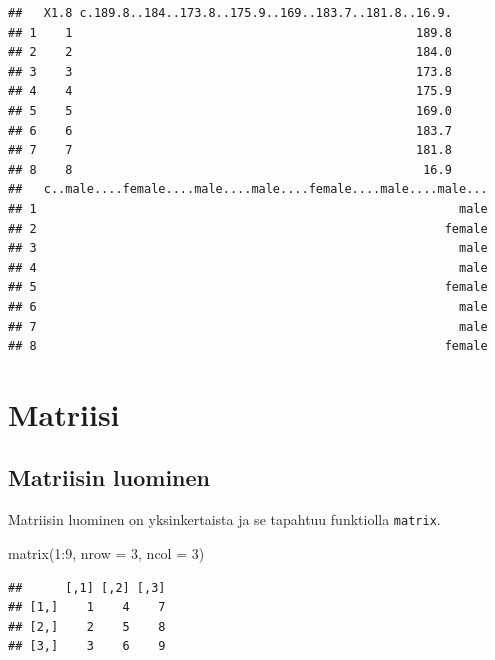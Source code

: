 \documentclass[
]{book}
\newenvironment{Shaded}{\begin{snugshade}}{\end{snugshade}}
\newcommand{\AttributeTok}[1]{\textcolor[rgb]{0.77,0.63,0.00}{#1}}
\newcommand{\DecValTok}[1]{\textcolor[rgb]{0.00,0.00,0.81}{#1}}
\newcommand{\FunctionTok}[1]{\textcolor[rgb]{0.00,0.00,0.00}{#1}}
\newcommand{\NormalTok}[1]{#1}
\newcommand{\SpecialCharTok}[1]{\textcolor[rgb]{0.00,0.00,0.00}{#1}}
\begin{document}
\begin{verbatim}
##   X1.8 c.189.8..184..173.8..175.9..169..183.7..181.8..16.9.
## 1    1                                                189.8
## 2    2                                                184.0
## 3    3                                                173.8
## 4    4                                                175.9
## 5    5                                                169.0
## 6    6                                                183.7
## 7    7                                                181.8
## 8    8                                                 16.9
##   c..male....female....male....male....female....male....male...
## 1                                                           male
## 2                                                         female
## 3                                                           male
## 4                                                           male
## 5                                                         female
## 6                                                           male
## 7                                                           male
## 8                                                         female
\end{verbatim}

\hypertarget{matrix}{%
\section{Matriisi}\label{matrix}}

\hypertarget{matriisin-luominen}{%
\subsection{Matriisin luominen}\label{matriisin-luominen}}

Matriisin luominen on yksinkertaista ja se tapahtuu funktiolla \texttt{matrix}.

\begin{Shaded}
\begin{Highlighting}[]
\FunctionTok{matrix}\NormalTok{(}\DecValTok{1}\SpecialCharTok{:}\DecValTok{9}\NormalTok{, }\AttributeTok{nrow =} \DecValTok{3}\NormalTok{, }\AttributeTok{ncol =} \DecValTok{3}\NormalTok{)}
\end{Highlighting}
\end{Shaded}

\begin{verbatim}
##      [,1] [,2] [,3]
## [1,]    1    4    7
## [2,]    2    5    8
## [3,]    3    6    9
\end{verbatim}
\end{document}
